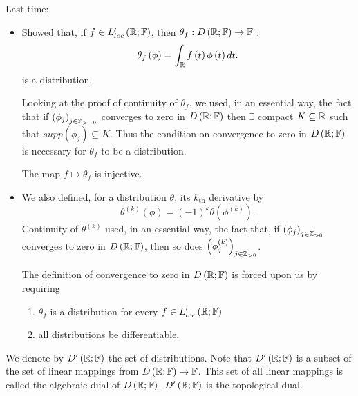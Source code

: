 
Last time: 
\begin{itemize}
	\item Showed that, if $f \in  L_{loc}' \left( \mathbb{R}; \mathbb{F} \right) $, then $\theta_{f} : D\left( \mathbb{R}; \mathbb{F} \right)  \to \mathbb{F}$ : 
		\[
			\theta_{f}\left( \phi \right) = \int_{\mathbb{R}}^{ } f\left( t  \right) \phi\left( t \right) dt 
		.\] is a distribution. 

Looking at the proof of continuity of $\theta_{f}$, we used, in an essential way, the fact that if $\left( \phi_{j} \right) _{j \in \mathbb{Z}_{>-0}}$ converges to zero in $D\left( \mathbb{R}; \mathbb{F} \right) $ then $\exists $ compact $K \subseteq \mathbb{R}$ such that $supp\left( \phi_{j} \right) \subseteq K$. Thus the condition on convergence to zero in $D\left( \mathbb{R} ; \mathbb{F}\right) $ is necessary for $\theta_{f}$ to be a distribution. 

\begin{note}
	The map $f \longmapsto \theta _{f}$ is injective.
\end{note}
\item We also defined, for a distribution $\theta$, its $k_{\text{th}}$ derivative by 
	\[
		\theta^{\left( k \right) }\left( \phi \right)  = \left( -1 \right) ^{k}\theta \left( \phi^{\left( k \right) } \right) 
	.\] 
	Continuity of $\theta^{\left( k \right) }$ used, in an essential way, the fact that, if $\left( \phi_{j} \right) _{j \in \mathbb{Z}_{>0}}$ converges to zero in $D\left( \mathbb{R}; \mathbb{F} \right) $, then so does $\left( \phi_{j}^{\left( k \right) } \right) _{j \in  \mathbb{Z}_{>0}}$. 
	\begin{result}
		The definition of convergence to zero in $D\left( \mathbb{R}; \mathbb{F} \right) $ is forced upon us by requiring 
		\begin{enumerate}
			\item $\theta_{f}$ is a distribution for every $f \in  L_{loc}' \left( \mathbb{R}; \mathbb{F} \right) $ 
			\item all distributions be differentiable. 
		\end{enumerate}
	\end{result}
\end{itemize}

\begin{notation}
	We denote by $D'\left( \mathbb{R}; \mathbb{F} \right) $ the set of distributions. Note that $D'\left( \mathbb{R} ; \mathbb{F}	\right) $ is a subset of the set of linear mappings from $D\left( \mathbb{R}; \mathbb{F} \right) \to \mathbb{F}$. This set of all linear mappings is called the algebraic dual of $D\left( \mathbb{R}; \mathbb{F} \right) $. $D'\left( \mathbb{R}; \mathbb{F} \right) $ is the topological dual. 
\end{notation}

